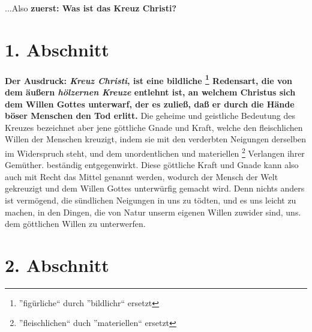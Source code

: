 ...Also \textbf{zuerst: Was ist das Kreuz Christi?}

\section{1. Abschnitt} \label{kap3_ab1} 
\textbf{Der Ausdruck: \textit{Kreuz Christi}, ist eine bildliche \footnote{
''figürliche`` durch ''bildlichr`` ersetzt} Redensart, die von dem äußern
\textit{hölzernen Kreuze}  entlehnt ist, an welchem 
 Christus sich dem Willen Gottes
unterwarf, der es zuließ, daß er durch die Hände böser Menschen den Tod erlitt.}
Die geheime und geistliche Bedeutung des Kreuzes bezeichnet aber jene göttliche
Gnade und Kraft, welche den fleischlichen Willen der Menschen kreuzigt, indem
sie mit den verderbten Neigungen derselben im Widerspruch steht, und dem
unordentlichen und materiellen \footnote{''fleischlichen`` duch ''materiellen`` 
ersetzt} Verlangen ihrer Gemüther. beständig
entgegenwirkt. Diese göttliche Kraft und Gnade kann also auch mit Recht das
Mittel genannt werden, wodurch der Mensch der Welt gekreuzigt und dem Willen
Gottes unterwürfig gemacht wird. Denn nichts anders ist vermögend, die
sündlichen Neigungen in uns zu tödten, und es uns leicht zu machen, in den
Dingen, die von Natur unserm eigenen Willen zuwider sind, uns. dem göttlichen
Willen zu unterwerfen.

\section{2. Abschnitt} \label{kap3_ab2} 

